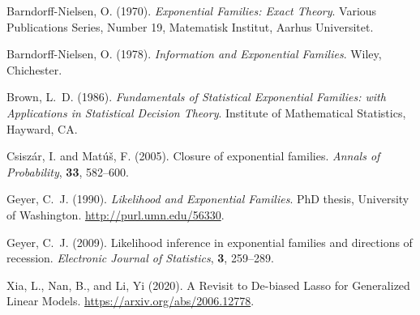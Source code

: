 \documentclass[12pt]{article}
\begin{document}
\begin{thebibliography}{0}

Barndorff-Nielsen, O. (1970).
\newblock \emph{Exponential Families: Exact Theory}.
\newblock Various Publications Series, Number 19, Matematisk Institut,
    Aarhus Universitet.

Barndorff-Nielsen, O. (1978).
\newblock \emph{Information and Exponential Families}.
\newblock Wiley, Chichester.

Brown, L.~D. (1986).
\newblock \emph{Fundamentals of Statistical Exponential Families: with
    Applications in Statistical Decision Theory}.
\newblock Institute of Mathematical Statistics, Hayward, CA.

Csisz\'{a}r, I. and Mat\'{u}\v{s}, F. (2005).
\newblock Closure of exponential families.
\newblock \emph{Annals of Probability}, \textbf{33}, 582--600.

Geyer, C.~J. (1990).
\newblock \emph{Likelihood and Exponential Families}.
\newblock PhD thesis, University of Washington.
\newblock \url{http://purl.umn.edu/56330}.

Geyer, C.~J. (2009).
\newblock Likelihood inference in exponential families and directions
    of recession.
\newblock \emph{Electronic Journal of Statistics}, \textbf{3}, 259--289.

Xia, L., Nan, B., and Li, Yi (2020).
\newblock A Revisit to De-biased Lasso for Generalized Linear Models.
\newblock \url{https://arxiv.org/abs/2006.12778}.

\end{thebibliography}
\end{document}
